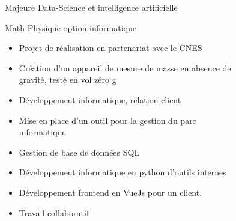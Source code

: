 \documentclass[10pt,a4paper,ragged2e,withhyper]{altacv}
\begin{document}
\begin{paracol}{2}

Majeure Data-Science et intelligence artificielle

\divider


\divider

Math Physique option informatique

\begin{comment}
    
\divider

\cvevent{Lycée filière scientifique}{Lycée Sainte Marie du port}{2013-2016}{}
Bac mention très bien \\
Option spécialité math
\end{comment}


\begin{itemize}
\item Projet de réalisation en partenariat avec le CNES
\item Création d'un appareil de mesure de masse en absence de \\
gravité, testé en vol zéro g
\end{itemize}

\divider

\begin{itemize}
\item Développement informatique, relation client
\item Mise en place d'un outil pour la gestion du parc\\
informatique
\item Gestion de base de données SQL
\end{itemize}

\divider

\begin{itemize}
\item Développement informatique en python d'outils internes
\item Développement frontend en VueJs pour un client.
\item Travail collaboratif
\end{itemize}


\end{paracol}
\end{document}
